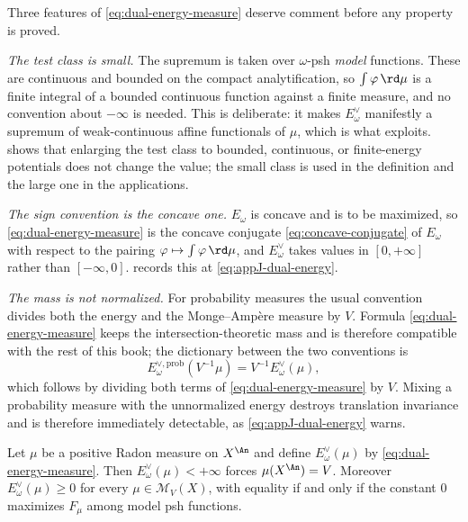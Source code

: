 Three features of \eqref{eq:dual-energy-measure} deserve comment before any
property is proved.

\emph{The test class is small.}  The supremum is taken over
$\omega$-psh \emph{model} functions.  These are continuous and bounded on the compact analytification, so
$\int\varphi\,\rd\mu$ is a finite integral of a bounded continuous function
against a finite measure, and no convention about $-\infty$ is needed.
This is deliberate: it makes $E^\vee_\omega$ manifestly a supremum of
weak-continuous affine functionals of $\mu$, which is what
 exploits.
 shows that enlarging the test class to bounded,
continuous, or finite-energy potentials does not change the value; the small
class is used in the definition and the large one in the applications.

\emph{The sign convention is the concave one.}  $E_\omega$ is concave and
is to be maximized, so \eqref{eq:dual-energy-measure} is the concave
conjugate \eqref{eq:concave-conjugate} of $E_\omega$ with respect to the
pairing $\varphi\mapsto\int\varphi\,\rd\mu$, and
$E^\vee_\omega$ takes values in $[0,+\infty]$ rather than
$[-\infty,0]$.   records this at
\eqref{eq:appJ-dual-energy}.

\emph{The mass is not normalized.}  For probability measures the usual
convention divides both the energy and the Monge--Amp\`ere measure by $V$.
Formula \eqref{eq:dual-energy-measure} keeps the intersection-theoretic mass
and is therefore compatible with the rest of this book; the dictionary
between the two conventions is
\begin{equation}
\label{eq:ch28-probability-dictionary}
 E_\omega^{\vee,\mathrm{prob}}(V^{-1}\mu)=V^{-1}E_\omega^\vee(\mu),
\end{equation}
which follows by dividing both terms of \eqref{eq:dual-energy-measure} by
$V$.  Mixing a probability measure with the unnormalized energy destroys
translation invariance and is therefore immediately detectable, as
\eqref{eq:appJ-dual-energy} warns.

\begin{lemma}
\label{lem:ch28-mass-forced}
Let $\mu$ be a positive Radon measure on $X^{\An}$ and define
$E^\vee_\omega(\mu)$ by \eqref{eq:dual-energy-measure}.  Then
$E^\vee_\omega(\mu)<+\infty$ forces $\mu(X^{\An})=V$.  Moreover
$E^\vee_\omega(\mu)\geq0$ for every $\mu\in\mathcal M_V(X)$, with
equality if and only if the constant $0$ maximizes $F_\mu$ among model
psh functions.
\end{lemma}

